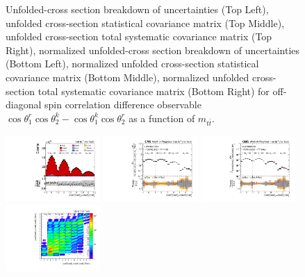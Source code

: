 \begin{refsection}
\begin{figure}[htb]
\begin{center}
\caption{Unfolded-cross section breakdown of uncertainties (Top Left), unfolded cross-section statistical covariance matrix (Top Middle), unfolded cross-section total systematic covariance matrix (Top Right), normalized unfolded-cross section breakdown of uncertainties (Bottom Left), normalized unfolded cross-section statistical covariance matrix (Bottom Middle), normalized unfolded cross-section total systematic covariance matrix (Bottom Right) for off-diagonal spin correlation difference observable $\cos\theta_{1}^{r}\cos\theta_{2}^{k}-\cos\theta_{1}^{k}\cos\theta_{2}^{r}$ as a function of $m_{t\bar{t}}$.}
\label{fig:c_Mrk_mttbar_uncertainties}
\end{center}
\end{figure}
\clearpage
\begin{figure}[htb]
\begin{center}
 \includegraphics[width=0.32\textwidth]{fig_fullRun2UL/controlplots/combined/Hyp_LLBarCPnr_vs_TTBarMass.pdf}
 \includegraphics[width=0.32\textwidth]{fig_fullRun2UL/unfolding/combined/UnfoldedResults_c_Pnr_mttbar.pdf}
 \includegraphics[width=0.32\textwidth]{fig_fullRun2UL/unfolding/combined/UnfoldedResultsNorm_c_Pnr_mttbar.pdf} \\
 \includegraphics[width=0.32\textwidth]{fig_fullRun2UL/unfolding/combined/ResponseMatrix_c_Pnr_mttbar.pdf}

\end{center}
\end{figure}
\end{refsection}
